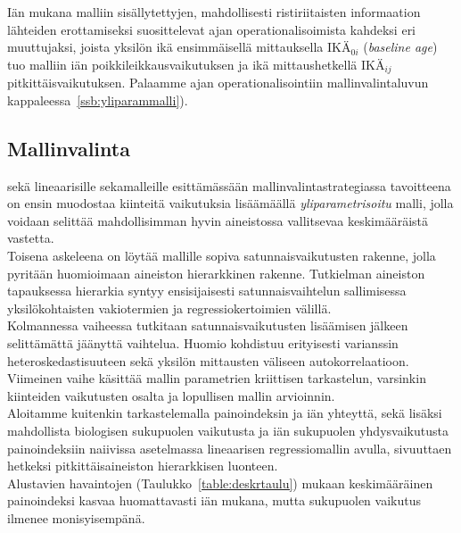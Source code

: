 \documentclass[finnish]{docopts}
\begin{document}
Iän mukana malliin sisällytettyjen, mahdollisesti ristiriitaisten informaation lähteiden erottamiseksi \cite{fitzmaurice11} suosittelevat ajan operationalisoimista kahdeksi eri muuttujaksi, joista yksilön ikä ensimmäisellä mittauksella $\text{IKÄ}_{0i}$ (\textit{baseline age}) tuo malliin iän poikkileikkausvaikutuksen ja ikä mittaushetkellä $\text{IKÄ}_{ij}$ pitkittäisvaikutuksen. Palaamme ajan operationalisointiin mallinvalintaluvun kappaleessa~\ref{ssb:yliparammalli}).\\

\subsection{Mallinvalinta}
\label{ssb:ylhalas}

\cite{west14} sekä \cite{verbeke00} lineaarisille sekamalleille esittämässään mallinvalintastrategiassa tavoitteena on ensin muodostaa kiinteitä vaikutuksia lisäämäällä \textit{yliparametrisoitu} malli, jolla voidaan selittää mahdollisimman hyvin aineistossa vallitsevaa keskimääräistä vastetta.\\

Toisena askeleena on löytää mallille sopiva satunnaisvaikutusten rakenne, jolla pyritään huomioimaan aineiston hierarkkinen rakenne. Tutkielman aineiston tapauksessa hierarkia syntyy ensisijaisesti satunnaisvaihtelun sallimisessa yksilökohtaisten vakiotermien ja regressiokertoimien välillä.\\

Kolmannessa vaiheessa tutkitaan satunnaisvaikutusten lisäämisen jälkeen selittämättä jäänyttä vaihtelua. Huomio kohdistuu erityisesti varianssin heteroskedastisuuteen sekä yksilön mittausten väliseen autokorrelaatioon.\\ 
Viimeinen vaihe käsittää mallin parametrien kriittisen tarkastelun, varsinkin kiinteiden vaikutusten osalta ja lopullisen mallin arvioinnin.\\

Aloitamme kuitenkin tarkastelemalla painoindeksin ja iän yhteyttä, sekä lisäksi mahdollista biologisen sukupuolen vaikutusta ja iän sukupuolen yhdysvaikutusta painoindeksiin naiivissa asetelmassa lineaarisen regressiomallin avulla, sivuuttaen hetkeksi pitkittäisaineiston hierarkkisen luonteen.\\

Alustavien havaintojen (Taulukko~\ref{table:deskrtaulu}) mukaan keskimääräinen painoindeksi kasvaa huomattavasti iän mukana, mutta sukupuolen vaikutus ilmenee monisyisempänä.\\
\end{document}
